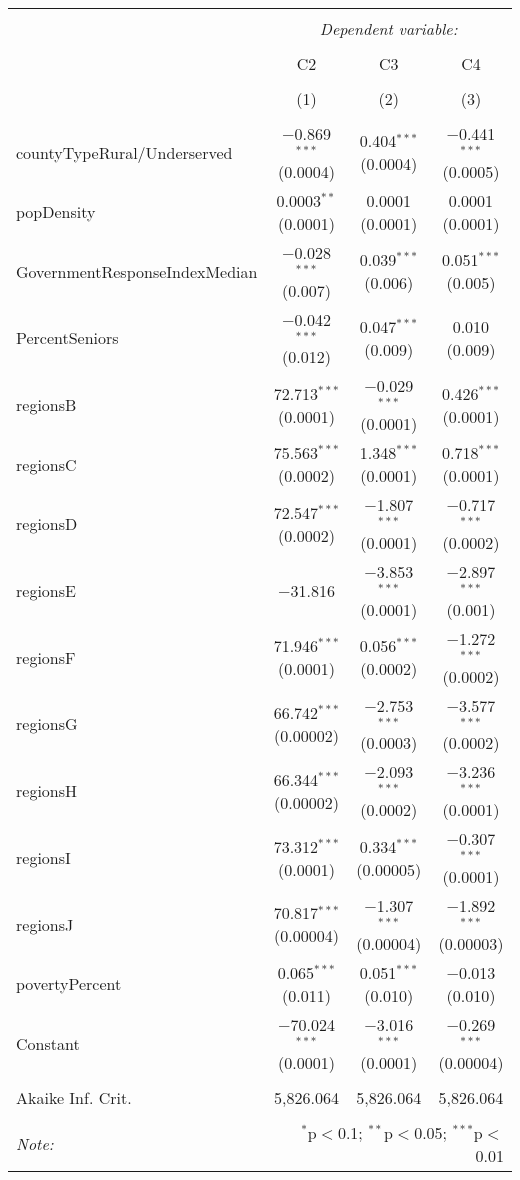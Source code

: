 
\begin{table}[!htbp] \centering 
  \caption{} 
  \label{} 
\begin{tabular}{@{\extracolsep{5pt}}lccc} 
\\[-1.8ex]\hline 
\hline \\[-1.8ex] 
 & \multicolumn{3}{c}{\textit{Dependent variable:}} \\ 
\cline{2-4} 
\\[-1.8ex] & C2 & C3 & C4 \\ 
\\[-1.8ex] & (1) & (2) & (3)\\ 
\hline \\[-1.8ex] 
 countyTypeRural/Underserved & $-$0.869$^{***}$ (0.0004) & 0.404$^{***}$ (0.0004) & $-$0.441$^{***}$ (0.0005) \\ 
  popDensity & 0.0003$^{**}$ (0.0001) & 0.0001 (0.0001) & 0.0001 (0.0001) \\ 
  GovernmentResponseIndexMedian & $-$0.028$^{***}$ (0.007) & 0.039$^{***}$ (0.006) & 0.051$^{***}$ (0.005) \\ 
  PercentSeniors & $-$0.042$^{***}$ (0.012) & 0.047$^{***}$ (0.009) & 0.010 (0.009) \\ 
  regionsB & 72.713$^{***}$ (0.0001) & $-$0.029$^{***}$ (0.0001) & 0.426$^{***}$ (0.0001) \\ 
  regionsC & 75.563$^{***}$ (0.0002) & 1.348$^{***}$ (0.0001) & 0.718$^{***}$ (0.0001) \\ 
  regionsD & 72.547$^{***}$ (0.0002) & $-$1.807$^{***}$ (0.0001) & $-$0.717$^{***}$ (0.0002) \\ 
  regionsE & $-$31.816 & $-$3.853$^{***}$ (0.0001) & $-$2.897$^{***}$ (0.001) \\ 
  regionsF & 71.946$^{***}$ (0.0001) & 0.056$^{***}$ (0.0002) & $-$1.272$^{***}$ (0.0002) \\ 
  regionsG & 66.742$^{***}$ (0.00002) & $-$2.753$^{***}$ (0.0003) & $-$3.577$^{***}$ (0.0002) \\ 
  regionsH & 66.344$^{***}$ (0.00002) & $-$2.093$^{***}$ (0.0002) & $-$3.236$^{***}$ (0.0001) \\ 
  regionsI & 73.312$^{***}$ (0.0001) & 0.334$^{***}$ (0.00005) & $-$0.307$^{***}$ (0.0001) \\ 
  regionsJ & 70.817$^{***}$ (0.00004) & $-$1.307$^{***}$ (0.00004) & $-$1.892$^{***}$ (0.00003) \\ 
  povertyPercent & 0.065$^{***}$ (0.011) & 0.051$^{***}$ (0.010) & $-$0.013 (0.010) \\ 
  Constant & $-$70.024$^{***}$ (0.0001) & $-$3.016$^{***}$ (0.0001) & $-$0.269$^{***}$ (0.00004) \\ 
 \hline \\[-1.8ex] 
Akaike Inf. Crit. & 5,826.064 & 5,826.064 & 5,826.064 \\ 
\hline 
\hline \\[-1.8ex] 
\textit{Note:}  & \multicolumn{3}{r}{$^{*}$p$<$0.1; $^{**}$p$<$0.05; $^{***}$p$<$0.01} \\ 
\end{tabular} 
\end{table} 
